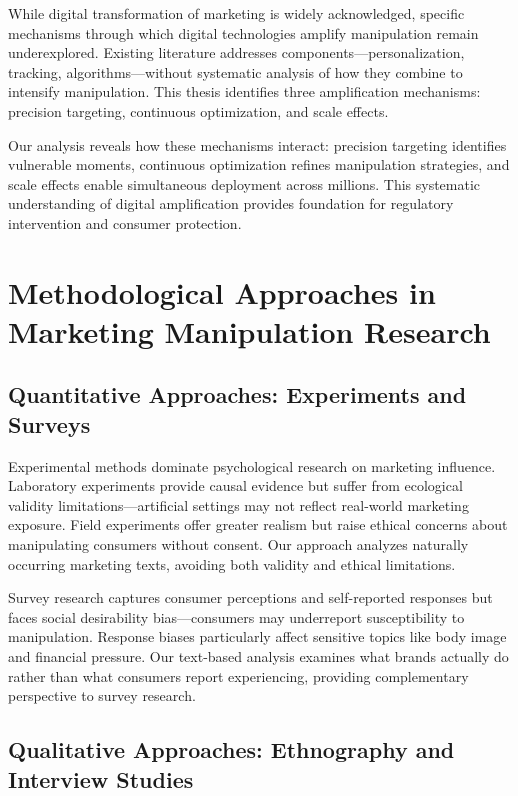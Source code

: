 While digital transformation of marketing is widely acknowledged, specific mechanisms through which digital technologies amplify manipulation remain underexplored. Existing literature addresses components—personalization, tracking, algorithms—without systematic analysis of how they combine to intensify manipulation. This thesis identifies three amplification mechanisms: precision targeting, continuous optimization, and scale effects.

Our analysis reveals how these mechanisms interact: precision targeting identifies vulnerable moments, continuous optimization refines manipulation strategies, and scale effects enable simultaneous deployment across millions. This systematic understanding of digital amplification provides foundation for regulatory intervention and consumer protection.

\section{Methodological Approaches in Marketing Manipulation Research}
\label{sec:methods_lit}

\subsection{Quantitative Approaches: Experiments and Surveys}

Experimental methods dominate psychological research on marketing influence. Laboratory experiments provide causal evidence but suffer from ecological validity limitations—artificial settings may not reflect real-world marketing exposure. Field experiments offer greater realism but raise ethical concerns about manipulating consumers without consent. Our approach analyzes naturally occurring marketing texts, avoiding both validity and ethical limitations.

Survey research captures consumer perceptions and self-reported responses but faces social desirability bias—consumers may underreport susceptibility to manipulation. Response biases particularly affect sensitive topics like body image and financial pressure. Our text-based analysis examines what brands actually do rather than what consumers report experiencing, providing complementary perspective to survey research.

\subsection{Qualitative Approaches: Ethnography and Interview Studies}

